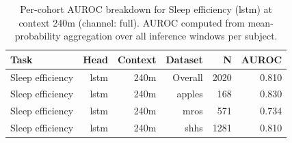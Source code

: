 \begin{table}[ht]
\centering
\caption{Per-cohort AUROC breakdown for Sleep efficiency (lstm) at context 240m (channel: full). AUROC computed from mean-probability aggregation over all inference windows per subject.}
\label{tab:cohort_sleep_efficiency_binary_lstm_full}
\begin{tabular}{lrrrrr}
\toprule
Task & Head & Context & Dataset & N & AUROC \\
\midrule
Sleep efficiency & lstm & 240m & Overall & 2020 & 0.810 \\
Sleep efficiency & lstm & 240m & apples & 168 & 0.830 \\
Sleep efficiency & lstm & 240m & mros & 571 & 0.734 \\
Sleep efficiency & lstm & 240m & shhs & 1281 & 0.810 \\
\bottomrule
\end{tabular}
\end{table}